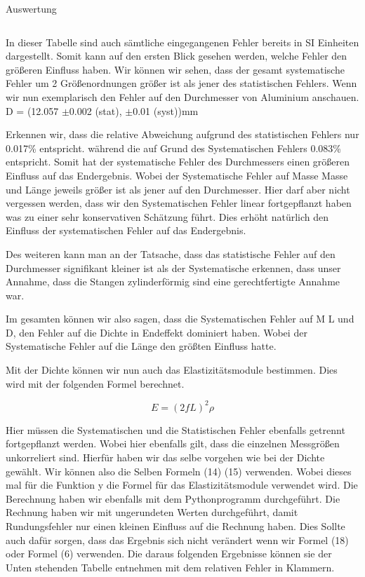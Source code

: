 \documentclass[twoside]{protokoll}
\begin{document}
\begin{aufgabe}{Auswertung}
\begin{table}[H]
\begin{tabularx}{1\textwidth}{l X X X X}
            \bottomrule
        \end{tabularx}
        \label{tab:mytable}
    \end{table}

In dieser Tabelle sind auch sämtliche eingegangenen Fehler bereits in SI Einheiten dargestellt. Somit kann auf den ersten Blick gesehen werden, welche Fehler den größeren 
Einfluss haben. Wir können wir sehen, dass der gesamt systematische Fehler um 2 Größenordnungen größer ist als jener des statistischen Fehlers. Wenn wir nun exemplarisch den Fehler auf den Durchmesser von Aluminium anschauen.
 D = (12.057 $\pm$0.002 (stat), $\pm$0.01 (syst))mm 
 
Erkennen wir, dass die relative Abweichung aufgrund des statistischen 
Fehlers nur 0.017\% entspricht. während die auf Grund des Systematischen Fehlers
0.083\% entspricht. Somit hat der systematische Fehler des Durchmessers
einen größeren Einfluss auf das Endergebnis. Wobei der Systematische Fehler auf Masse 
Masse und Länge jeweils größer ist als jener auf den Durchmesser. 
Hier darf aber nicht vergessen werden, dass wir den Systematischen Fehler linear fortgepflanzt haben was zu einer sehr konservativen Schätzung führt. Dies erhöht 
natürlich den Einfluss der systematischen Fehler auf das Endergebnis. 

Des weiteren kann man an der Tatsache, dass das statistische Fehler auf den Durchmesser 
signifikant kleiner ist als der Systematische erkennen, dass unser Annahme, 
dass die Stangen zylinderförmig sind eine gerechtfertigte Annahme war. 

Im gesamten können wir also sagen, dass die Systematischen Fehler auf M L und D, den
Fehler auf die Dichte in Endeffekt dominiert haben. Wobei der Systematische Fehler auf
die Länge den größten Einfluss hatte.  

Mit der Dichte können wir nun auch das Elastizitätsmodule bestimmen. Dies wird mit der folgenden Formel berechnet. 

    \begin{equation}
         E = (2fL)^2 \rho
    \end{equation}
    
Hier müssen die Systematischen und die Statistischen Fehler ebenfalls getrennt fortgepflanzt werden. Wobei hier ebenfalls gilt, dass die einzelnen Messgrößen 
unkorreliert sind. Hierfür haben wir das selbe vorgehen wie bei der Dichte gewählt.
Wir können also die Selben Formeln (14) (15) verwenden. 
Wobei dieses mal für die Funktion y die Formel für das Elastizitätsmodule verwendet wird. Die Berechnung haben wir ebenfalls mit dem Pythonprogramm durchgeführt. 
Die Rechnung haben wir mit ungerundeten Werten durchgeführt, damit Rundungsfehler nur einen kleinen Einfluss auf die Rechnung haben. 
Dies Sollte auch dafür sorgen, dass das Ergebnis sich nicht verändert wenn wir Formel (18) oder Formel (6) verwenden.
Die daraus folgenden Ergebnisse können sie der Unten stehenden Tabelle entnehmen mit dem relativen Fehler in Klammern.


\end{aufgabe}
\end{document}
